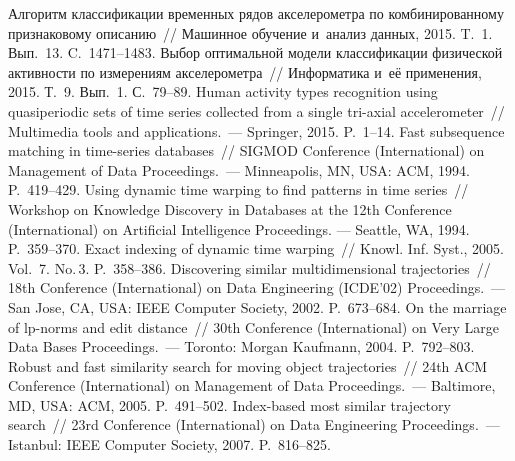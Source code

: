 \begin{multicols}{2}
{\small\frenchspacing
 {%
 \begin{thebibliography}{99}


Алгоритм классификации временных рядов акселерометра по комбинированному 
признаковому описанию~// Машинное обучение и~анализ данных, 2015. T.~1. Вып.~13. C.~1471--1483.
 Выбор оптимальной модели классификации физической 
активности по измерениям акселерометра~// Информатика и~её применения, 2015. Т.~9. 
Вып.~1. С.~79--89.
     Human activity types recognition using 
    quasiperiodic sets of time series collected from a single tri-axial accelerometer~// 
    Multimedia tools and applications.~--- Springer, 2015. P.~1--14.
 Fast subsequence matching 
in time-series databases~// SIGMOD  Conference (International) 
on Management of Data Proceedings.~--- Minneapolis, MN, USA: ACM, 1994. P.~419--429.
 Using dynamic time warping to find patterns 
in time series~// Workshop on Knowledge Discovery in Databases 
at the 12th  Conference (International) on Artificial Intelligence
Proceedings. --- Seattle, WA, 1994. P.~359--370.
 Exact indexing of dynamic time warping~// 
Knowl. Inf. Syst., 2005. Vol.~7. No.\,3. P.~358--386.
 Discovering similar multidimensional 
trajectories~// 18th  Conference (International) on Data Engineering (ICDE'02)
Proceedings.~--- San Jose, CA, USA: IEEE Computer Society, 2002. P.~673--684.
 On the marriage of lp-norms and edit distance~// 
30th  Conference (International) on Very Large Data Bases 
Proceedings.~--- Toronto: Morgan Kaufmann, 2004. P.~792--803.
Robust and fast similarity search for moving object trajectories~// 
24th ACM  Conference (International) on Management of Data 
Proceedings.~--- Baltimore, MD, USA: ACM, 2005. P.~491--502.
Index-based most similar trajectory search~// 
23rd  Conference (International) on Data Engineering 
Proceedings.~--- Istanbul: IEEE Computer Society, 2007. P.~816--825.

\end{thebibliography}}}
\end{multicols}
